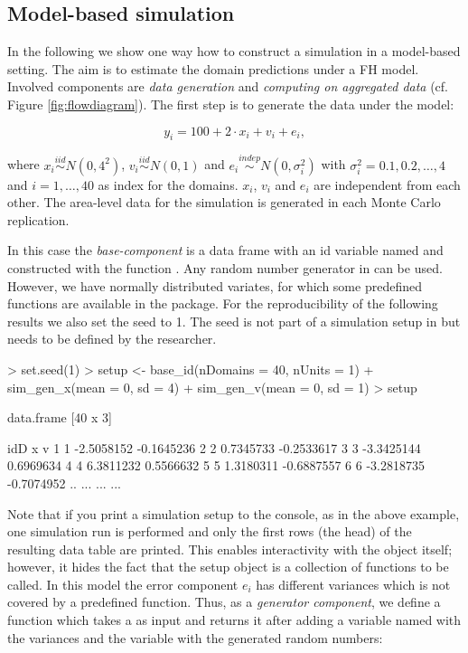 \documentclass[article]{ajs}
\begin{document}
\subsection{Model-based simulation}
\label{sec:csModel}

In the following we show one way how to construct a simulation in a model-based setting. The aim is to estimate the domain predictions under a FH model. Involved components are \textit{data generation} and \textit{computing on aggregated data} (cf. Figure \ref{fig:flowdiagram}). The first step is to generate the data under the model:

\[ y_i = 100 + 2 \cdot x_i + v_i + e_i,\]

where $x_i \stackrel{iid}{\sim} N(0, 4^2)$, $v_i \stackrel{iid}{\sim} N(0, 1)$ and $e_i \stackrel{indep}{\sim} N(0, \sigma_i^2)$ with $\sigma_i^2 = 0.1, 0.2, \dots, 4$ and $i = 1, \dots, 40$ as index for the domains. $x_i$, $v_i$ and $e_i$ are independent from each other. The area-level data for the simulation is generated in each Monte Carlo replication. 

In this case the \textit{base-component} is a data frame with an id variable named  and constructed with the function . Any random number generator in  can be used. However, we have normally distributed variates, for which some predefined functions are available in the package. For the reproducibility of the following results we also set the seed to 1. The seed is not part of a simulation setup in  but needs to be defined by the researcher.

\begin{Schunk}
\begin{Sinput}
> set.seed(1)
> setup <- base_id(nDomains = 40, nUnits = 1) %
+   sim_gen_x(mean = 0, sd = 4) %
+   sim_gen_v(mean = 0, sd = 1)
> setup
\end{Sinput}
\begin{Soutput}
data.frame [40 x 3]

   idD          x          v
1    1 -2.5058152 -0.1645236
2    2  0.7345733 -0.2533617
3    3 -3.3425144  0.6969634
4    4  6.3811232  0.5566632
5    5  1.3180311 -0.6887557
6    6 -3.2818735 -0.7074952
.. ...        ...        ...
\end{Soutput}
\end{Schunk}

Note that if you print a simulation setup to the console, as in the above example, one simulation run is performed and only the first rows (the head) of the resulting data table are printed. This enables interactivity with the object itself; however, it hides the fact that the setup object is a collection of functions to be called. In this model the error component $e_i$ has different variances which is not covered by a predefined function. Thus, as a \textit{generator component}, we define a function which takes a  as input and returns it after adding a variable named  with the variances and the variable  with the generated random numbers:
\end{document}
